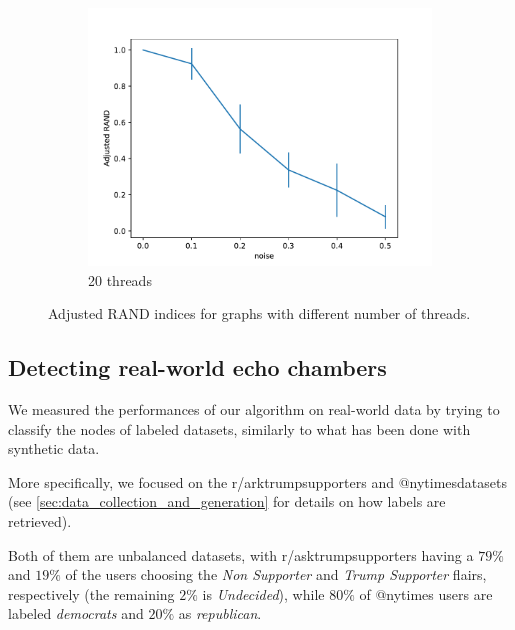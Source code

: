\begin{figure}
\begin{center}
		\begin{subfigure}[b]{0.3\textwidth}
			\centering
			\includegraphics[width=\textwidth]{tex/out/synthetic_20t/model2_noise_adj_rand.pdf}
			\caption{20 threads}
			\label{fig:tex/out/synthetic_8t/model2_noise_adj_rand.pdf}
		\end{subfigure}
	\end{center}
	\caption{Adjusted RAND indices for graphs with different number of threads.}
	\label{fig:clustering-threads}
\end{figure}

\subsection{Detecting real-world echo chambers}%
\label{sub:detecting_real_echo_chambers}

We measured the performances of our algorithm on real-world data by trying to
classify the nodes of labeled datasets, similarly to what has been done
with synthetic data.

More specifically, we focused on the r/arktrumpsupporters and
@nytimes\footnotemark datasets (see
\autoref{sec:data_collection_and_generation} for details on how labels are
retrieved).

Both of them are unbalanced datasets, with r/asktrumpsupporters having a $79\%$
and $19\%$ of the users choosing the \emph{Non Supporter} and \emph{Trump
	Supporter} flairs, respectively (the remaining $2\%$ is
\emph{Undecided}), while $80\%$ of @nytimes users are labeled \emph{democrats}
and $20\%$ as \emph{republican}.

